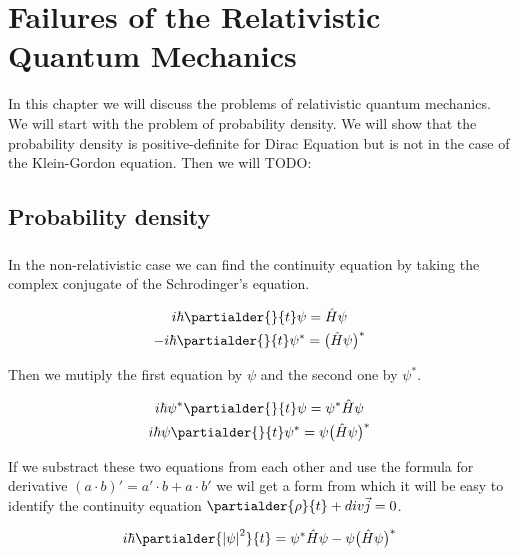 \chapter{Failures of the Relativistic Quantum Mechanics}

In this chapter we will discuss the problems of relativistic quantum mechanics. We will start
with the problem of probability density. We will show that the probability density is positive-definite for Dirac Equation
but is not in the case of the Klein-Gordon equation. Then we will TODO:

\section{Probability density}

\paragraph{} In the non-relativistic case we can find the continuity equation by taking the complex conjugate
of the Schrodinger's equation.

\begin{equation*}
    \begin{gathered}
        i \hbar \partialder{}{t} \psi = \hat{H} \psi \\
        - i \hbar \partialder{}{t} \psi^{*} = \big(\hat{H} \psi \big)^{*}
    \end{gathered}
\end{equation*}

Then we mutiply the first equation by $\psi$ and the second one by $\psi^{*}$.

\begin{equation*}
    \begin{gathered}
        i \hbar \psi^{*} \partialder{}{t} \psi = \psi^{*} \hat{H} \psi \\
        i \hbar \psi \partialder{}{t} \psi^{*} = \psi \big(\hat{H} \psi \big)^{*}
    \end{gathered}
\end{equation*}

If we substract these two equations from each other and use the formula for derivative $(a \cdot b)' = a' \cdot b + a \cdot b'$
we wil get a form from which it will be easy to identify the continuity equation $\partialder{\rho}{t} + div \vec{j} = 0$.

\begin{equation*}
    i \hbar \partialder{\left|\psi\right|^{2}}{t}  = \psi^{*} \hat{H} \psi - \psi \big(\hat{H} \psi \big)^{*}
\end{equation*}


